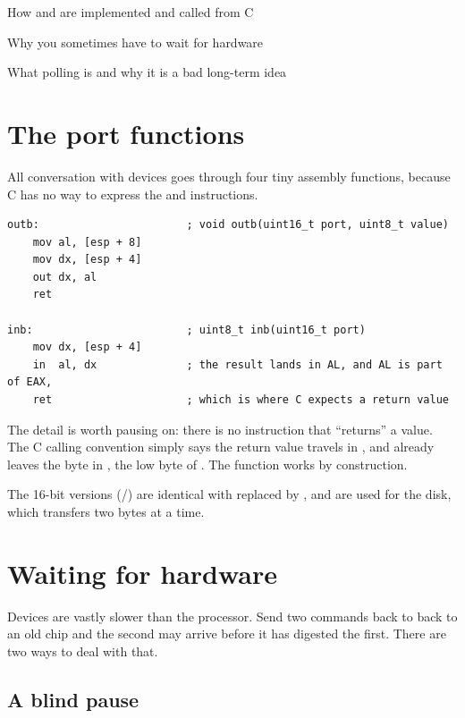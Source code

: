 \begin{goals}
  \item How  and  are implemented and called from C
  \item Why you sometimes have to wait for hardware
  \item What polling is and why it is a bad long-term idea
\end{goals}

\section{The port functions}

All conversation with devices goes through four tiny assembly functions, because C has no way to
express the  and  instructions.

\begin{lstlisting}[style=asm]
outb:                       ; void outb(uint16_t port, uint8_t value)
    mov al, [esp + 8]
    mov dx, [esp + 4]
    out dx, al
    ret

inb:                        ; uint8_t inb(uint16_t port)
    mov dx, [esp + 4]
    in  al, dx              ; the result lands in AL, and AL is part of EAX,
    ret                     ; which is where C expects a return value
\end{lstlisting}

The  detail is worth pausing on: there is no instruction that ``returns'' a value. The C
calling convention simply says the return value travels in , and  already
leaves the byte in , the low byte of . The function works by construction.

The 16-bit versions (/) are identical with  replaced by , and
are used for the disk, which transfers two bytes at a time.

\section{Waiting for hardware}

Devices are vastly slower than the processor. Send two commands back to back to an old chip and
the second may arrive before it has digested the first. There are two ways to deal with that.

\subsection{A blind pause}

